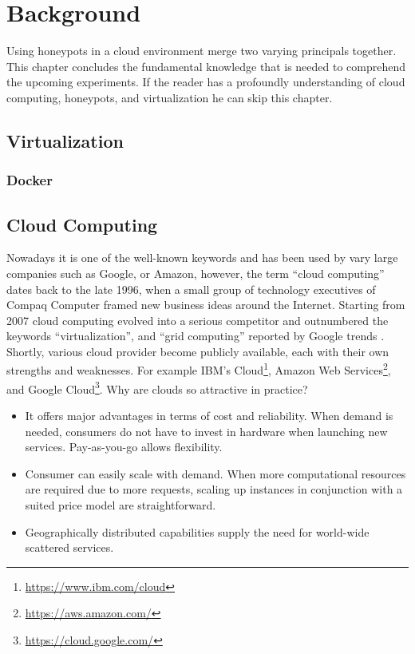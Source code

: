 \chapter{Background}

Using honeypots in a cloud environment merge two varying principals together. This chapter concludes the fundamental knowledge that is needed to comprehend the upcoming experiments. If the reader has a profoundly understanding of cloud computing, honeypots, and virtualization he can skip this chapter.

\section{Virtualization}

\subsection{Docker}

\section{Cloud Computing}

Nowadays it is one of the well-known keywords and has been used by vary large companies such as Google, or Amazon, however, the term \enquote{cloud computing} dates back to the late 1996, when a small group of technology executives of Compaq Computer framed new business ideas around the Internet.\cite{regalado2020} Starting from 2007 cloud computing evolved into a serious competitor and outnumbered the keywords \enquote{virtualization}, and \enquote{grid computing} reported by Google trends \cite{Wang2010}. Shortly, various cloud provider become publicly available, each with their own strengths and weaknesses. For example IBM's Cloud\footnote{\url{https://www.ibm.com/cloud}}, Amazon Web Services\footnote{\url{https://aws.amazon.com/}}, and Google Cloud\footnote{\url{https://cloud.google.com/}}. Why are clouds so attractive in practice?

\begin{itemize}
    \item It offers major advantages in terms of cost and reliability. When demand is needed, consumers do not have to invest in hardware when launching new services. Pay-as-you-go allows flexibility.
    \item Consumer can easily scale with demand. When more computational resources are required due to more requests, scaling up instances in conjunction with a suited price model are straightforward.
    \item Geographically distributed capabilities supply the need for world-wide scattered services.
\end{itemize}

